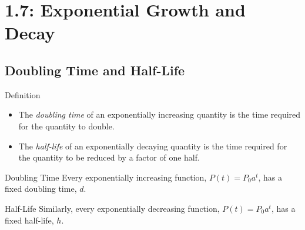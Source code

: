 \documentclass[Lecture.tex]{subfiles}
\begin{document}
\section{1.7: Exponential Growth and Decay}
\subsection{Doubling Time and Half-Life}
\begin{frame}{Definition}
  \begin{defn}
    \begin{itemize}
    \item<1->
      The {\it doubling time} of an exponentially increasing quantity is the time required for the quantity to double.
    \item<2->
      The {\it half-life} of an exponentially decaying quantity is the time required for the quantity to be reduced by a factor of one half.
    \end{itemize}
  \end{defn}
\end{frame}

\begin{frame}{Doubling Time}
  Every exponentially increasing function, $P(t) = P_0a^t$, has a fixed doubling time, $d$.
\end{frame}

\begin{frame}{Half-Life}
  Similarly, every exponentially decreasing function, $P(t) = P_0a^t$, has a fixed half-life, $h$.
\end{frame}
\end{document}
